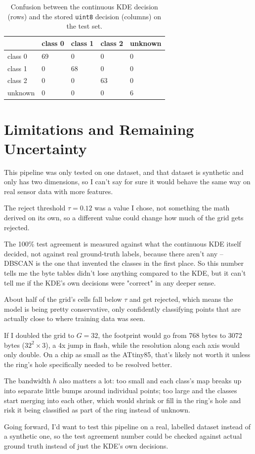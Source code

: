 \documentclass[10pt,a4paper,twocolumn]{article}
\begin{document}
\begin{table}[!bt]
\centering
\caption{Confusion between the continuous KDE decision (rows) and
the stored \texttt{uint8} decision (columns) on the test set.}
\label{tab:confusion}
\begin{tabularx}{\linewidth}{@{}l X X X X@{}}
\toprule
 & class 0 & class 1 & class 2 & unknown \\
\midrule
class 0 & 69 & 0 & 0 & 0 \\
class 1 & 0 & 68 & 0 & 0 \\
class 2 & 0 & 0 & 63 & 0 \\
unknown & 0 & 0 & 0 & 6 \\
\bottomrule
\end{tabularx}
\end{table}
 
\section{Limitations and Remaining Uncertainty}

This pipeline was only tested on one dataset, and that dataset is synthetic and only has two dimensions, so I can't say for sure it would behave the same way on real sensor data with more features.

The reject threshold $\tau = 0.12$ was a value I chose, not something the math derived on its own, so a different value could change how much of the grid gets rejected.

The 100\% test agreement is measured against what the continuous KDE itself decided, not against real ground-truth labels, because there aren't any -- DBSCAN is the one that invented the classes in the first place. So this number tells me the byte tables didn't lose anything compared to the KDE, but it can't tell me if the KDE's own decisions were "correct" in any deeper sense.

About half of the grid's cells fall below $\tau$ and get rejected, which means the model is being pretty conservative, only confidently classifying points that are actually close to where training data was seen.

If I doubled the grid to $G=32$, the footprint would go from 768 bytes to 3072 bytes ($32^2 \times 3$), a 4x jump in flash, while the resolution along each axis would only double. On a chip as small as the ATtiny85, that's likely not worth it unless the ring's hole specifically needed to be resolved better.

The bandwidth $h$ also matters a lot: too small and each class's map breaks up into separate little bumps around individual points; too large and the classes start merging into each other, which would shrink or fill in the ring's hole and risk it being classified as part of the ring instead of unknown.

Going forward, I'd want to test this pipeline on a real, labelled dataset instead of a synthetic one, so the test agreement number could be checked against actual ground truth instead of just the KDE's own decisions.
\end{document}

